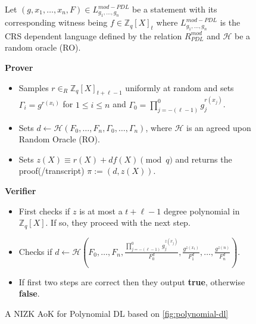 \begin{figure}[ht]
    \centering
    \begin{tcolorbox}[title=$\pi_{PDL}^{mod}$, width=0.9\textwidth, colframe=blue!75!black, colback=blue!10, sharp corners]
        Let $(g,x_1,\dots,x_n,F)\in L_{g_1,\dots,g_n}^{mod-PDL}$ be a statement with its corresponding witness being $f\in\mathbb{Z}_q[X]_t$ 
        where $L_{g_1,\dots,g_n}^{mod-PDL}$ is the CRS dependent language defined by the relation $R_{PDL}^{mod}$ and $\mathcal{H}$ be a 
        random oracle (RO).
        
        \vspace{0.5em}
        \textbf{Prover}
        \begin{itemize}
            \item Samples $r\in_{R}\mathbb{Z}_q[X]_{t+\ell-1}$ uniformly at random and sets 
                $\Gamma_i=g^{r(x_i)}$ for $1\leq i\leq n$ and $\Gamma_0=\prod_{j=-(\ell-1)}^{0}g_j^{r(x_j)}$.
            \item Sets $d\leftarrow \mathcal{H}(F_0, \dots, F_n, \Gamma_0, \dots, \Gamma_n)$, where $\mathcal{H}$ is 
                an agreed upon Random Oracle (RO).
            \item Sets $z(X)\equiv r(X)+df(X) \pmod{q}$ and returns the proof(/transcript) $\pi:= (d,z(X))$.
        \end{itemize}
        
        \vspace{0.5em}
        \textbf{Verifier}
        \begin{itemize}
            \item First checks if $z$ is at most a $t+\ell-1$ degree polynomial in $\mathbb{Z}_q[X]$. If so, they proceed with the next step.
            \item Checks if $d\leftarrow \mathcal{H}(F_0, \dots, F_n,\frac{\prod_{j=-(\ell-1)}^{0}g_j^{z(x_j)}}{F_0^d},\frac{g^{z(x_1)}}{F_1^d}, \dots, \frac{g^{z(n)}}{F_n^d})$. 
            \item If first two steps are correct then they output \textbf{true}, otherwise \textbf{false}.
        \end{itemize}
    \end{tcolorbox}
    \caption{A NIZK AoK for Polynomial DL based on \ref{fig:polynomial-dl}}
    \label{fig:mod-polynomial-dl}
\end{figure}
